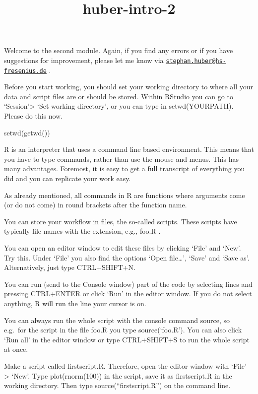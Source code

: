\documentclass[
]{article}
\title{huber-intro-2}
\author{}
\date{\vspace{-2.5em}}
\newenvironment{Shaded}{\begin{snugshade}}{\end{snugshade}}
\newcommand{\FunctionTok}[1]{\textcolor[rgb]{0.00,0.00,0.00}{#1}}
\newcommand{\NormalTok}[1]{#1}
\begin{document}
\maketitle

Welcome to the second module. Again, if you find any errors or if you
have suggestions for improvement, please let me know via
\href{mailto:stephan.huber@hs-fresenius.de}{\nolinkurl{stephan.huber@hs-fresenius.de}}
.

Before you start working, you should set your working directory to where
all your data and script files are or should be stored. Within RStudio
you can go to `Session'\textgreater{} `Set working directory', or you
can type in setwd(YOURPATH). Please do this now.

\begin{Shaded}
\begin{Highlighting}[]
\FunctionTok{setwd}\NormalTok{(}\FunctionTok{getwd}\NormalTok{())}
\end{Highlighting}
\end{Shaded}

R is an interpreter that uses a command line based environment. This
means that you have to type commands, rather than use the mouse and
menus. This has many advantages. Foremost, it is easy to get a full
transcript of everything you did and you can replicate your work easy.

As already mentioned, all commands in R are functions where arguments
come (or do not come) in round brackets after the function name.

You can store your workflow in files, the so-called scripts. These
scripts have typically file names with the extension, e.g., foo.R .

You can open an editor window to edit these files by clicking `File' and
`New'. Try this. Under `File' you also find the options `Open
file\ldots{}', `Save' and `Save as'. Alternatively, just type
CTRL+SHIFT+N.

You can run (send to the Console window) part of the code by selecting
lines and pressing CTRL+ENTER or click `Run' in the editor window. If
you do not select anything, R will run the line your cursor is on.

You can always run the whole script with the console command source, so
e.g.~for the script in the file foo.R you type source(`foo.R'). You can
also click `Run all' in the editor window or type CTRL+SHIFT+S to run
the whole script at once.

Make a script called firstscript.R. Therefore, open the editor window
with `File' \textgreater{} `New'. Type plot(rnorm(100)) in the script,
save it as firstscript.R in the working directory. Then type
source(``firstscript.R'') on the command line.
\end{document}
